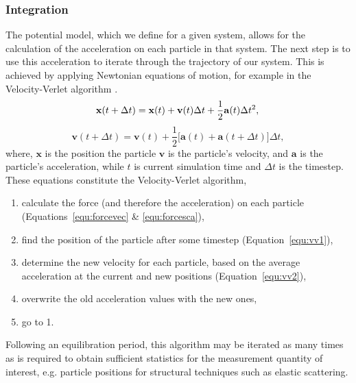 \subsubsection{Integration}
The potential model, which we define for a given system, allows for the calculation of the acceleration on each particle in that system.
The next step is to use this acceleration to iterate through the trajectory of our system.
This is achieved by applying Newtonian equations of motion, for example in the Velocity-Verlet algorithm \cite{swope_computer_1982}.
%
\begin{equation}
\mathbf{x}(t + \Delta t) = \mathbf{x}(t) + \mathbf{v}(t)\Delta t + \frac{1}{2}\mathbf{a}(t)\Delta t^2, \\
\label{equ:vv1}
\end{equation}
\begin{equation}
\mathbf{v}(t + \Delta t) = \mathbf{v}(t) + \frac{1}{2}\big[\mathbf{a}(t) + \mathbf{a}(t+\Delta t)\big]\Delta t,
\label{equ:vv2}
\end{equation}
%
where, $\mathbf{x}$ is the position the particle $\mathbf{v}$ is the particle's velocity, and $\mathbf{a}$ is the particle's acceleration, while $t$ is current simulation time and $\Delta t$ is the timestep.
These equations constitute the Velocity-Verlet algorithm,
%
\begin{enumerate}
\item calculate the force (and therefore the acceleration) on each particle (Equations~\ref{equ:forcevec} \& \ref{equ:forcesca}),
\item find the position of the particle after some timestep (Equation~\ref{equ:vv1}),
\item determine the new velocity for each particle, based on the average acceleration at the current and new positions (Equation~\ref{equ:vv2}),
\item overwrite the old acceleration values with the new ones,
\item go to 1.
\end{enumerate}
%
Following an equilibration period, this algorithm may be iterated as many times as is required to obtain sufficient statistics for the measurement quantity of interest, e.g. particle positions for structural techniques such as elastic scattering.

